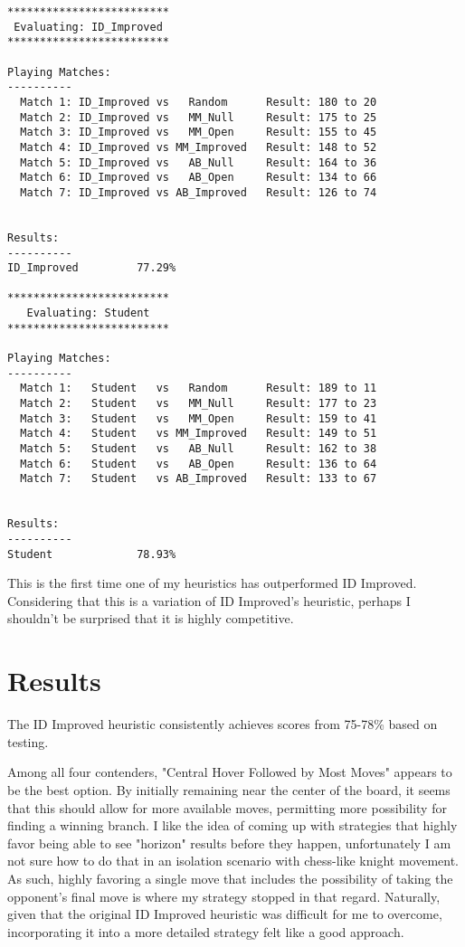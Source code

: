 \documentclass[10pt, a4paper]{article}
\begin{document}
\begin{verbatim}
*************************
 Evaluating: ID_Improved 
*************************

Playing Matches:
----------
  Match 1: ID_Improved vs   Random    	Result: 180 to 20
  Match 2: ID_Improved vs   MM_Null   	Result: 175 to 25
  Match 3: ID_Improved vs   MM_Open   	Result: 155 to 45
  Match 4: ID_Improved vs MM_Improved 	Result: 148 to 52
  Match 5: ID_Improved vs   AB_Null   	Result: 164 to 36
  Match 6: ID_Improved vs   AB_Open   	Result: 134 to 66
  Match 7: ID_Improved vs AB_Improved 	Result: 126 to 74


Results:
----------
ID_Improved         77.29%

*************************
   Evaluating: Student   
*************************

Playing Matches:
----------
  Match 1:   Student   vs   Random    	Result: 189 to 11
  Match 2:   Student   vs   MM_Null   	Result: 177 to 23
  Match 3:   Student   vs   MM_Open   	Result: 159 to 41
  Match 4:   Student   vs MM_Improved 	Result: 149 to 51
  Match 5:   Student   vs   AB_Null   	Result: 162 to 38
  Match 6:   Student   vs   AB_Open   	Result: 136 to 64
  Match 7:   Student   vs AB_Improved 	Result: 133 to 67


Results:
----------
Student             78.93%
\end{verbatim}

This is the first time one of my heuristics has outperformed ID Improved.  Considering that this
is a variation of ID Improved's heuristic, perhaps I shouldn't be surprised that it is highly competitive.

\section{Results}

The ID Improved heuristic consistently achieves scores from 75-78\% based on testing.

Among all four contenders, "Central Hover Followed by Most Moves" appears to be the best option.
By initially remaining near the center of the board, it seems
that this should allow for more available moves, permitting more possibility for finding a winning branch.
I like the idea of coming up with strategies that highly favor being able to see "horizon" results 
before they happen, unfortunately I am not sure how to do that in an isolation scenario with chess-like knight movement.
As such, highly favoring a single move that includes the possibility of taking the opponent's final move
is where my strategy stopped in that regard.  Naturally, given that the original ID Improved heuristic
was difficult for me to overcome, incorporating it into a more detailed strategy felt like a good approach.
\end{document}
